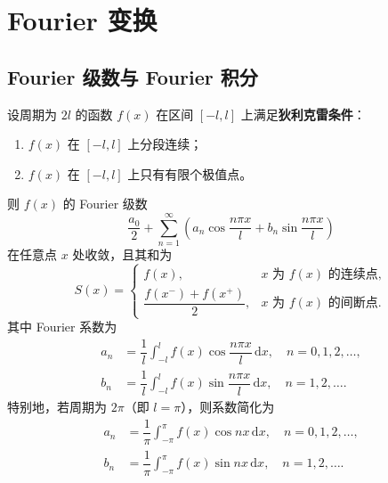 \chapter{Fourier 变换}

\section{Fourier 级数与 Fourier 积分}

\begin{theorem}
  设周期为 $2l$ 的函数 $f(x)$ 在区间 $[-l,l]$ 上满足\textbf{狄利克雷条件}：
  \begin{enumerate}
    \item $f(x)$ 在 $[-l,l]$ 上分段连续；
    \item $f(x)$ 在 $[-l,l]$ 上只有有限个极值点。
  \end{enumerate}
  则 $f(x)$ 的 Fourier 级数
  \[
  \frac{a_0}{2}+\sum_{n=1}^{\infty}\left(a_n\cos\frac{n\pi x}{l}+b_n\sin\frac{n\pi x}{l}\right)
  \]
  在任意点 $x$ 处收敛，且其和为
  \[
  S(x)=
  \begin{cases}
    f(x), & x\text{ 为 }f(x)\text{ 的连续点},\\[4pt]
    \dfrac{f(x^-)+f(x^+)}{2}, & x\text{ 为 }f(x)\text{ 的间断点}.
  \end{cases}
  \]
  其中 Fourier 系数为
  \[
  \begin{aligned}
    a_n&=\dfrac{1}{l}\int_{-l}^{l}f(x)\cos\dfrac{n\pi x}{l}\,\mathrm{d}x,\quad n=0,1,2,\dots,\\
    b_n&=\dfrac{1}{l}\int_{-l}^{l}f(x)\sin\dfrac{n\pi x}{l}\,\mathrm{d}x,\quad n=1,2,\dots.
  \end{aligned}
  \]
  特别地，若周期为 $2\pi$（即 $l=\pi$），则系数简化为
  \[
  \begin{aligned}
    a_n&=\dfrac{1}{\pi}\int_{-\pi}^{\pi}f(x)\cos nx\,\mathrm{d}x,\quad n=0,1,2,\dots,\\
    b_n&=\dfrac{1}{\pi}\int_{-\pi}^{\pi}f(x)\sin nx\,\mathrm{d}x,\quad n=1,2,\dots.
  \end{aligned}
  \]
\end{theorem}


